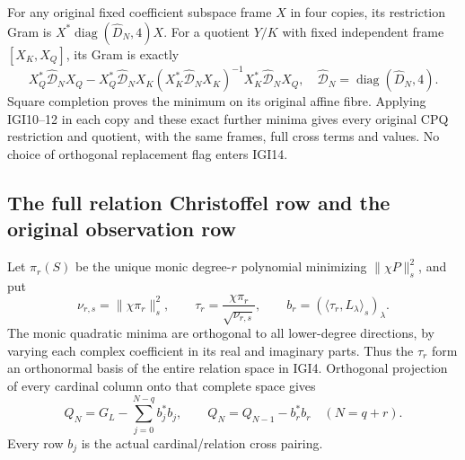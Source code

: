 \documentclass[11pt,a4paper]{article}
\begin{document}
For any original fixed coefficient subspace frame $X$ in four
copies, its restriction Gram is
$X^*\operatorname{diag}(\widehat D_N,4)X$. For a quotient
$Y/K$ with fixed independent frame $[X_K,X_Q]$, its Gram is exactly
\[
 X_Q^*\widehat{\mathcal D}_NX_Q
 -X_Q^*\widehat{\mathcal D}_NX_K
 (X_K^*\widehat{\mathcal D}_NX_K)^{-1}
 X_K^*\widehat{\mathcal D}_NX_Q,
 \quad\widehat{\mathcal D}_N=\operatorname{diag}(\widehat D_N,4).
                                                               \tag{IGI14}
\]
Square completion proves the minimum on its original affine
fibre. Applying IGI10--12 in each copy and these exact further
minima gives every original CPQ restriction and quotient, with
the same frames, full cross terms and values. No choice of
orthogonal replacement flag enters IGI14.

\subsection{The full relation Christoffel row and the original observation row}
Let $\pi_r(S)$ be the unique monic degree-$r$ polynomial minimizing
$\|\chi P\|_s^2$, and put
\[
 \nu_{r,s}=\|\chi\pi_r\|_s^2,
 \qquad\tau_r=\frac{\chi\pi_r}{\sqrt{\nu_{r,s}}},
 \qquad b_r=(\langle\tau_r,L_\lambda\rangle_s)_\lambda .    \tag{IGI15}
\]
The monic quadratic minima are orthogonal to all lower-degree
directions, by varying each complex coefficient in its real and
imaginary parts. Thus the $\tau_r$ form an orthonormal basis of
the entire relation space in IGI4. Orthogonal projection of every
cardinal column onto that complete space gives
\[
 Q_N=G_L-\sum_{j=0}^{N-q}b_j^*b_j,
 \qquad Q_N=Q_{N-1}-b_r^*b_r\quad(N=q+r).
                                                               \tag{IGI16}
\]
Every row $b_j$ is the actual cardinal/relation cross pairing.
\end{document}
